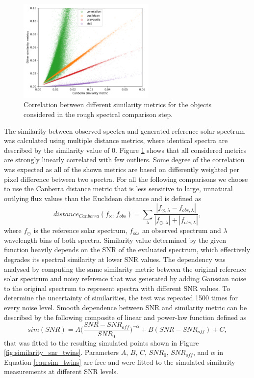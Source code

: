 \begin{figure}
	\centering
	\includegraphics[width=0.6\textwidth]{sim_combine_b2.png}
	\caption{Correlation between different similarity metrics for the objects considered in the rough spectral comparison step.}
	\label{fig:sim_combine_twins}
\end{figure}

The similarity between observed spectra and generated reference solar spectrum was calculated using multiple distance metrics, where identical spectra are described by the similarity value of 0. Figure \ref{fig:sim_combine_twins} shows that all considered metrics are strongly linearly correlated with few outliers. Some degree of the correlation was expected as all of the shown metrics are based on differently weighted per pixel difference between two spectra. For all the following comparisons we choose to use the Canberra distance metric \cite{Lance1967MixedDataCP} that is less sensitive to large, unnatural outlying flux values than the Euclidean distance and is defined as 
\begin{equation}
	\label{equ:equ_canberra}
	distance_{Canberra}(f_{\odot}, f_{obs}) = \sum_{\lambda}^{\ } \frac{|f_{\odot,\lambda} - f_{obs,\lambda}|}{|f_{\odot,\lambda}| + |f_{obs,\lambda}|},
\end{equation}
where $f_{\odot}$ is the reference solar spectrum, $f_{obs}$ an observed spectrum and $\lambda$ wavelength bins of both spectra. Similarity value determined by the given function heavily depends on the SNR of the evaluated spectrum, which effectively degrades its spectral similarity at lower SNR values. The dependency was analysed by computing the same similarity metric between the original reference solar spectrum and noisy reference that was generated by adding Gaussian noise to the original spectrum to represent spectra with different SNR values. To determine the uncertainty of similarities, the test was repeated 1500 times for every noise level. Smooth dependence between SNR and similarity metric can be described by the following composite of linear and power-law function defined as
\begin{equation}
	\label{equ:sim_twins}
	sim(SNR) = A \Big(\frac{SNR-SNR_{off}}{SNR_0}\Big)^{-\alpha} + B (SNR-SNR_{off}) + C,
\end{equation}
that was fitted to the resulting simulated points shown in Figure \ref{fig:similarity_snr_twins}. Parameters $A$, $B$, $C$, $SNR_0$, $SNR_{off}$, and $\alpha$ in Equation \ref{equ:sim_twins} are free and were fitted to the simulated similarity measurements at different SNR levels.


